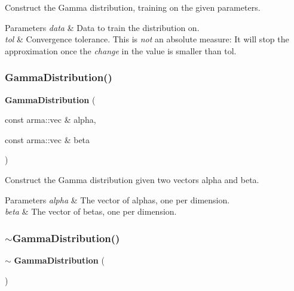 Construct the Gamma distribution, training on the given parameters. 


\begin{DoxyParams}{Parameters}
{\em data} & Data to train the distribution on. \\
\hline
{\em tol} & Convergence tolerance. This is {\itshape not} an absolute measure\+: It will stop the approximation once the {\itshape change} in the value is smaller than tol. \\
\hline
\end{DoxyParams}
\mbox{\label{classmlpack_1_1distribution_1_1GammaDistribution_a9267054c34f06ce056eb9e1e76334199}} 
\subsubsection{Gamma\+Distribution()\hspace{0.1cm}{\footnotesize\ttfamily [3/3]}}
{\footnotesize\ttfamily \textbf{ Gamma\+Distribution} (\begin{DoxyParamCaption}\item[{const arma\+::vec \&}]{alpha,  }\item[{const arma\+::vec \&}]{beta }\end{DoxyParamCaption})}



Construct the Gamma distribution given two vectors alpha and beta. 


\begin{DoxyParams}{Parameters}
{\em alpha} & The vector of alphas, one per dimension. \\
\hline
{\em beta} & The vector of betas, one per dimension. \\
\hline
\end{DoxyParams}
\mbox{\label{classmlpack_1_1distribution_1_1GammaDistribution_a3dfc2487502db9fd91b7a16a44f0014e}} 
\subsubsection{$\sim$\+Gamma\+Distribution()}
{\footnotesize\ttfamily $\sim$\textbf{ Gamma\+Distribution} (\begin{DoxyParamCaption}{ }\end{DoxyParamCaption})\hspace{0.3cm}{\ttfamily [inline]}}



